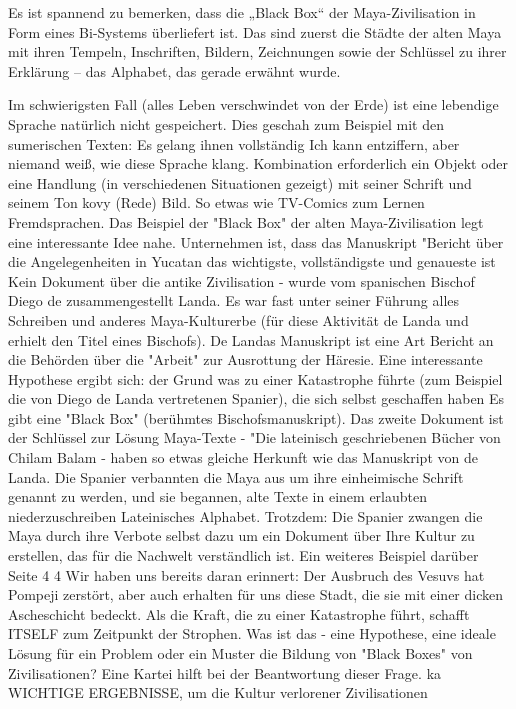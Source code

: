 \documentclass[11pt,a4paper]{article}
\begin{document}
Es ist spannend zu bemerken, dass die „Black Box“ der Maya-Zivilisation in
Form eines Bi-Systems überliefert ist.  Das sind zuerst die Städte der alten
Maya mit ihren Tempeln, Inschriften, Bildern, Zeichnungen sowie der Schlüssel
zu ihrer Erklärung -- das Alphabet, das gerade erwähnt wurde.

Im schwierigsten Fall (alles Leben verschwindet von der Erde) ist eine
lebendige Sprache natürlich nicht gespeichert. Dies geschah zum Beispiel
mit den sumerischen Texten: Es gelang ihnen vollständig Ich kann entziffern,
aber niemand weiß, wie diese Sprache klang. Kombination erforderlich ein
Objekt oder eine Handlung (in verschiedenen Situationen gezeigt) mit seiner
Schrift und seinem Ton kovy (Rede) Bild. So etwas wie TV-Comics zum Lernen
Fremdsprachen.  Das Beispiel der "Black Box" der alten Maya-Zivilisation legt
eine interessante Idee nahe. Unternehmen ist, dass das Manuskript "Bericht
über die Angelegenheiten in Yucatan das wichtigste, vollständigste und
genaueste ist Kein Dokument über die antike Zivilisation - wurde vom
spanischen Bischof Diego de zusammengestellt Landa. Es war fast unter seiner
Führung alles Schreiben und anderes Maya-Kulturerbe (für diese Aktivität de
Landa und erhielt den Titel eines Bischofs). De Landas Manuskript ist eine Art
Bericht an die Behörden über die "Arbeit" zur Ausrottung der Häresie. Eine
interessante Hypothese ergibt sich: der Grund was zu einer Katastrophe führte
(zum Beispiel die von Diego de Landa vertretenen Spanier), die sich selbst
geschaffen haben Es gibt eine "Black Box" (berühmtes Bischofsmanuskript). Das
zweite Dokument ist der Schlüssel zur Lösung Maya-Texte - "Die lateinisch
geschriebenen Bücher von Chilam Balam - haben so etwas gleiche Herkunft wie
das Manuskript von de Landa. Die Spanier verbannten die Maya aus um ihre
einheimische Schrift genannt zu werden, und sie begannen, alte Texte in einem
erlaubten niederzuschreiben Lateinisches Alphabet. Trotzdem: Die Spanier
zwangen die Maya durch ihre Verbote selbst dazu um ein Dokument über Ihre
Kultur zu erstellen, das für die Nachwelt verständlich ist. Ein weiteres
Beispiel darüber Seite 4 4 Wir haben uns bereits daran erinnert: Der Ausbruch
des Vesuvs hat Pompeji zerstört, aber auch erhalten für uns diese Stadt, die
sie mit einer dicken Ascheschicht bedeckt.  Als die Kraft, die zu einer
Katastrophe führt, schafft ITSELF zum Zeitpunkt der Strophen. Was ist das -
eine Hypothese, eine ideale Lösung für ein Problem oder ein Muster die Bildung
von "Black Boxes" von Zivilisationen? Eine Kartei hilft bei der Beantwortung
dieser Frage.  ka WICHTIGE ERGEBNISSE, um die Kultur verlorener Zivilisationen
\end{document}
